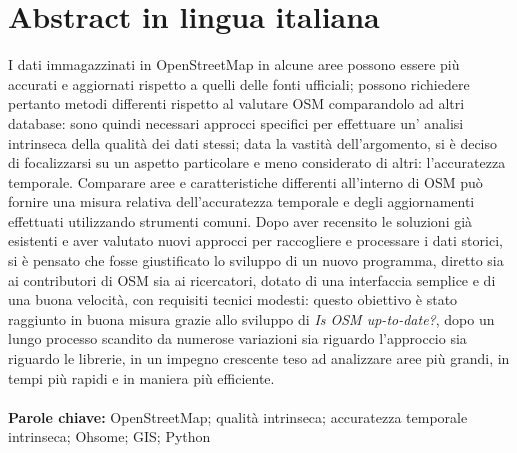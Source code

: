 \documentclass{Configuration_Files/PoliMi3i_thesis}
\begin{document}
\chapter*{Abstract in lingua italiana}

I dati immagazzinati in OpenStreetMap in alcune aree possono essere più accurati e aggiornati rispetto a quelli delle fonti ufficiali; possono richiedere pertanto metodi differenti rispetto al valutare OSM comparandolo ad altri database: sono quindi necessari approcci specifici per effettuare un' analisi intrinseca della qualità dei dati stessi; data la vastità dell'argomento, si è deciso di focalizzarsi su un aspetto particolare e meno considerato di altri: l'accuratezza temporale.
Comparare aree e caratteristiche differenti all'interno di OSM può fornire una misura relativa dell’accuratezza temporale e degli aggiornamenti effettuati utilizzando strumenti comuni. Dopo aver recensito le soluzioni già esistenti e aver valutato nuovi approcci per raccogliere e processare i dati storici, si è pensato che fosse giustificato lo sviluppo di un nuovo programma, diretto sia ai contributori di OSM sia ai ricercatori, dotato di una interfaccia semplice e di una buona velocità, con requisiti tecnici modesti: questo obiettivo è stato raggiunto in buona misura grazie allo sviluppo di \textit{Is OSM up-to-date?}, dopo un lungo processo scandito da numerose variazioni sia riguardo l’approccio sia riguardo le librerie, in un impegno crescente teso ad analizzare aree più grandi, in tempi più rapidi e in maniera più efficiente.
\\
\\
\textbf{Parole chiave:} OpenStreetMap; qualità intrinseca; accuratezza temporale intrinseca; Ohsome; GIS; Python


\thispagestyle{empty}
\tableofcontents %
\thispagestyle{empty}
\cleardoublepage

%
%
%    
%
\end{document}
